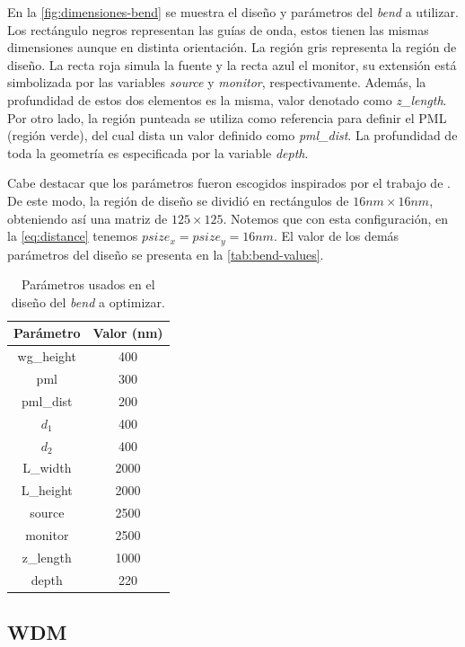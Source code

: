 En la \autoref{fig:dimensiones-bend} se muestra el diseño y parámetros del \emph{bend} a utilizar.
Los rectángulo negros representan las guías de onda, estos tienen las mismas dimensiones aunque en distinta orientación.
La región gris representa la región de diseño.
La recta roja simula la fuente y la recta azul el monitor, su extensión está
simbolizada por las variables \emph{source} y \emph{monitor}, respectivamente.
Además, la profundidad de estos dos elementos es la misma, valor denotado como \emph{z\_length}.
Por otro lado, la región punteada se utiliza como referencia para definir el PML (región verde),
del cual dista un valor definido como \emph{pml\_dist}. 
La profundidad de toda la geometría es especificada por la variable \emph{depth}.

Cabe destacar que los parámetros fueron escogidos inspirados por el trabajo de \cite{Su2020}.
De este modo, la región de diseño se dividió en rectángulos de $16nm \times 16 nm$, obteniendo así una
matriz de $125 \times 125$.
Notemos que con esta configuración, en la \autoref{eq:distance} tenemos $psize_x = psize_y = 16 nm$.
El valor de los demás parámetros del diseño se presenta en la \autoref{tab:bend-values}.

\begin{table}[ht]
    \centering
    \begin{tabular}{|c|c|}
    \hline 
    Parámetro &  Valor (nm) \\
    \hline 
    wg\_height & 400 \\
    pml & 300 \\
    pml\_dist & 200 \\
    $d_1$ & 400 \\
    $d_2$ & 400 \\
    L\_width & 2000 \\
    L\_height & 2000 \\
    source & 2500 \\
    monitor & 2500 \\
    z\_length & 1000 \\
    depth & 220 \\
    \hline 
    \end{tabular}
    \caption{Parámetros usados en el diseño del \emph{bend} a optimizar.}
    \label{tab:bend-values}
\end{table}

\subsection{WDM}

